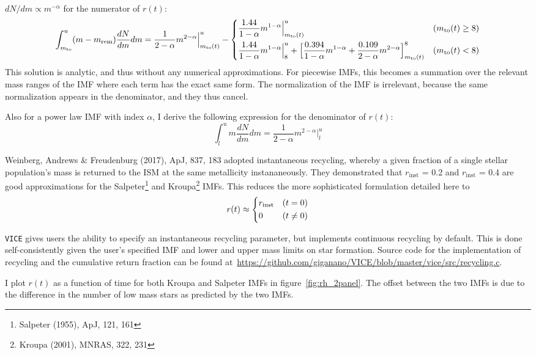 \documentclass{report}
\begin{document}
$dN/dm \propto m^{-\alpha}$ for the numerator of $r(t)$: 
\begin{equation}\begin{split}
\int_{m_\text{to}}^u (m - m_\text{rem})\frac{dN}{dm}dm = 
\frac{
	1
}{
	2 - \alpha
} m^{2 - \alpha}\Big|_{m_\text{to}(t)}^u  - 
\begin{dcases} 
\frac{1.44}{1 - \alpha}m^{1 - \alpha}\Big|_{m_\text{to}(t)}^u & 
(m_\text{to}(t) \geq 8) \\ 
\frac{1.44}{1 - \alpha}m^{1 - \alpha}\Big|_8^u + \Big[
\frac{0.394}{1 - \alpha}m^{1 - \alpha} + \frac{0.109}{2 - \alpha}m^{2 - \alpha}
\Big]_{m_\text{to}(t)}^8 & 
(m_\text{to}(t) < 8)
\end{dcases}
\end{split}\end{equation}
This solution is analytic, and thus without any numerical approximations. For 
piecewise IMFs, this becomes a summation over the relevant mass ranges of the 
IMF where each term has the exact same form. The normalization of the IMF is 
irrelevant, because the same normalization appears in the denominator, and 
they thus cancel. 
\par 
Also for a power law IMF with index $\alpha$, I derive the following 
expression for the denominator of $r(t)$: 
\begin{equation}
\int_l^u m\frac{dN}{dm}dm = \frac{1}{2 - \alpha}m^{2 - \alpha}\Big|_l^u
\end{equation}
\par
Weinberg, Andrews \& Freudenburg (2017), ApJ, 837, 183 adopted 
instantaneous recycling, whereby a given fraction of a single stellar 
population's mass is returned to the ISM at the same metallicity 
instananeously. They demonstrated that $r_\text{inst}$ = 0.2 and 
$r_\text{inst}$ = 0.4 are good approximations for the 
Salpeter\footnote{
	Salpeter (1955), ApJ, 121, 161
} and Kroupa\footnote{
	Kroupa (2001), MNRAS, 322, 231 
} IMFs. This reduces the more sophisticated formulation detailed here to 
\begin{equation}
r(t) \approx 
\begin{dcases} 
r_\text{inst} & (t = 0) \\ 
0 & (t \neq 0)
\end{dcases} 
\end{equation}
\par
\texttt{VICE} gives users the ability to specify an instantaneous recycling 
parameter, but implements continuous recycling by default. This is done 
self-consistently given the user's specified IMF and lower and upper mass 
limits on star formation. Source code for the implementation of recycling and 
the cumulative return fraction can be found 
at~\url{https://github.com/giganano/VICE/blob/master/vice/src/recycling.c}. 
\par
I plot $r(t)$ as a function of time for both Kroupa and Salpeter IMFs in 
figure~\ref{fig:rh_2panel}. The offset between the two IMFs is due to the 
difference in the number of low mass stars as predicted by the two IMFs. 
\end{document}
